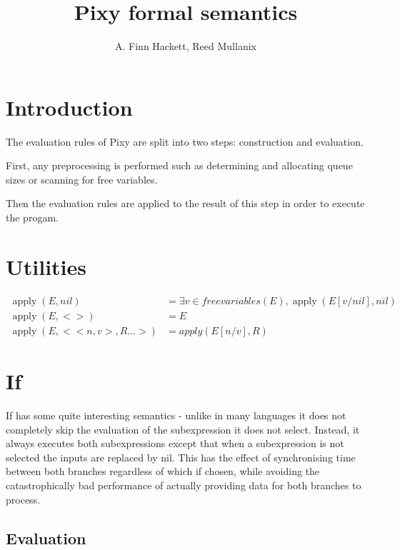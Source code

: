 \documentclass{scrartcl}
\DeclareMathOperator{\apply}{apply}
\begin{document}
    \title{Pixy formal semantics}
    \author{A. Finn Hackett, Reed Mullanix}
    \maketitle
    
    \section{Introduction}
    
    The evaluation rules of Pixy are split into two steps: construction and evaluation.
    
    First, any preprocessing is performed such as determining and allocating queue sizes or scanning for free variables.
    
    Then the evaluation rules are applied to the result of this step in order to execute the progam.
    
    \section{Utilities}
    
    \begin{align*}
        \apply(E, nil) & = \exists v \in freevariables(E), \apply(E[v/nil], nil) \\
        \apply(E, <>) & = E \\
        \apply(E, <<n, v>, R...>) & = apply(E[n/v], R)
    \end{align*}
    
    \section{If}
    
    If has some quite interesting semantics - unlike in many languages it does not completely skip
    the evaluation of the subexpression it does not select. Instead, it always executes both
    subexpressions except that when a subexpression is not selected the inputs are replaced
    by nil. This has the effect of synchronising time between both branches regardless of which
    if chosen, while avoiding the catastrophically bad performance of actually providing data
    for both branches to process.
    
    \subsection{Evaluation}
    
\end{document}

